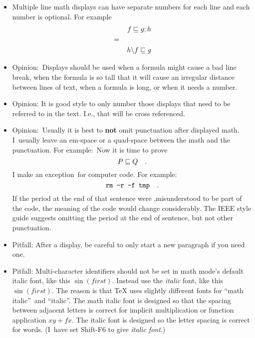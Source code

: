 \begin{itemize}
\item Multiple line math displays can have separate numbers for each line
and each number is optional. For example%
\begin{eqnarray}
&&\left. f\sqsubseteq g;h\right.   \label{eq:wpreLHS} \\
&=&  \notag \\
&&\left. h\backslash f\sqsubseteq g\right.   \label{eq:wpreRHS}
\end{eqnarray}

\item Opinion:\ Displays should be used when a formula might cause a bad
line break, when the formula is so tall that it will cause an irregular
distance between lines of text, when a formula is long, or when it needs a
number.

\item Opinion: It is good style to only number those displays that need to
be referred to in the text. I.e., that will be cross referenced.

\item Opinion:\ Usually it is best to \textbf{not} omit punctuation after
displayed math. I\ usually leave an em-space or a quad-space between the
math and the punctuation. For example:\ Now it is time to prove%
\begin{equation*}
P\sqsubseteq Q\text{\quad .}
\end{equation*}%
I make an exception\ for computer code. For example:\ 
\begin{equation*}
\text{\texttt{rm -r -f tmp}\quad .}
\end{equation*}%
If the period at the end of that sentence were ,misunderstood to be part of
the code, the meaning of the code would change considerably. The IEEE style
guide suggests omitting the period at the end of sentence, but not other
punctuation.

\item Pitfall: After a display, be careful to only start a new paragraph if
you need one.

\item Pitfall: Multi-character identifiers should not be set in math mode's
default italic font, like this $\sin (first)$. Instead use the \textit{italic%
} font, like this $\sin (\mathit{first})$. The reason is that TeX uses
slightly different fonts for \textquotedblleft math
italic\textquotedblright\ and \textquotedblleft italic\textquotedblright .
The math italic font is designed so that the spacing between adjacent
letters is correct for implicit multiplication or function application $xy+fx
$. The italic font is designed so the letter spacing is correct for words.
(I\ have set Shift-F6 to give \textit{italic font}.)


\end{itemize}
